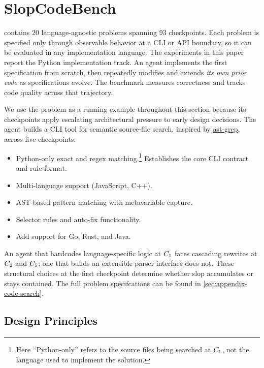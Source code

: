 \section{SlopCodeBench}
\label{sec:benchmark}

\scb{} contains 20 language-agnostic problems spanning 93 checkpoints. Each problem is specified only through observable behavior at a CLI or API boundary, so it can be evaluated in any implementation language. The experiments in this paper report the Python implementation track. An agent implements the first specification from scratch, then repeatedly modifies and extends \emph{its own prior code} as specifications evolve. The benchmark measures correctness and tracks code quality across that trajectory.

We use the \codesearch{} problem as a running example throughout this section\label{sec:running-example} because its checkpoints apply escalating architectural pressure to early design decisions. The agent builds a CLI tool for semantic source-file search, inspired by \href{https://ast-grep.github.io}{ast-grep}, across five checkpoints:
\begin{itemize}
    \item[$\ckpt{1}$ -] Python-only exact and regex matching.\footnote{Here ``Python-only'' refers to the source files being searched at $\ckpt{1}$, not the language used to implement the solution.} Establishes the core CLI contract and rule format.
    \item[$\ckpt{2}$ -] Multi-language support (JavaScript, C++).
    \item[$\ckpt{3}$ -] AST-based pattern matching with metavariable capture.
    \item[$\ckpt{4}$ -] Selector rules and auto-fix functionality.
    \item[$\ckpt{5}$ -] Add support for Go, Rust, and Java.
\end{itemize}
An agent that hardcodes language-specific logic at $\ckpt{1}$ faces cascading rewrites at $\ckpt{2}$ and $\ckpt{5}$; one that builds an extensible parser interface does not. These structural choices at the first checkpoint determine whether slop accumulates or stays contained. The full problem specifcations can be found in \autoref{sec:appendix-code-search}.

\subsection{Design Principles}\label{sec:design-principles}

